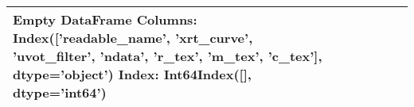 \begin{tabular}{lllrlll}
\toprule
Empty DataFrame
Columns: Index(['readable_name', 'xrt_curve', 'uvot_filter', 'ndata', 'r_tex', 'm_tex',
       'c_tex'],
      dtype='object')
Index: Int64Index([], dtype='int64') \\
\bottomrule
\end{tabular}
